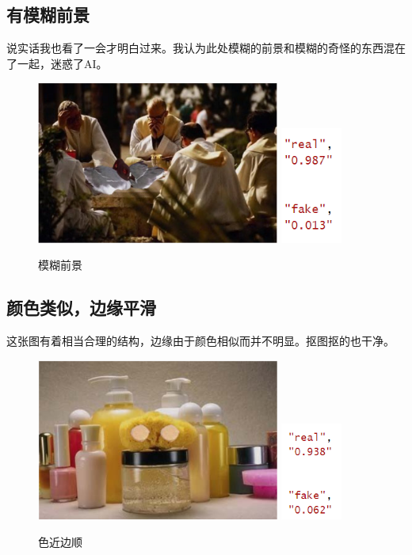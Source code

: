\documentclass[boldfont,linespread=1.35]{ctexart}
\begin{document}
\subsection{有模糊前景}
说实话我也看了一会才明白过来。我认为此处模糊的前景和模糊的奇怪的东西混在了一起，迷惑了AI。
\begin{figure}[h]
	\centering
	{\includegraphics[width=8cm]{1}}
	{\includegraphics[width=2cm]{2}}
	\color{gray}\caption{模糊前景}
\end{figure}
\subsection{颜色类似，边缘平滑}
这张图有着相当合理的结构，边缘由于颜色相似而并不明显。抠图抠的也干净。
\begin{figure}[h]
	\centering
	{\includegraphics[width=8cm]{3}}
	{\includegraphics[width=2cm]{4}}
	\color{gray}\caption{色近边顺}
\end{figure}
\end{document}
